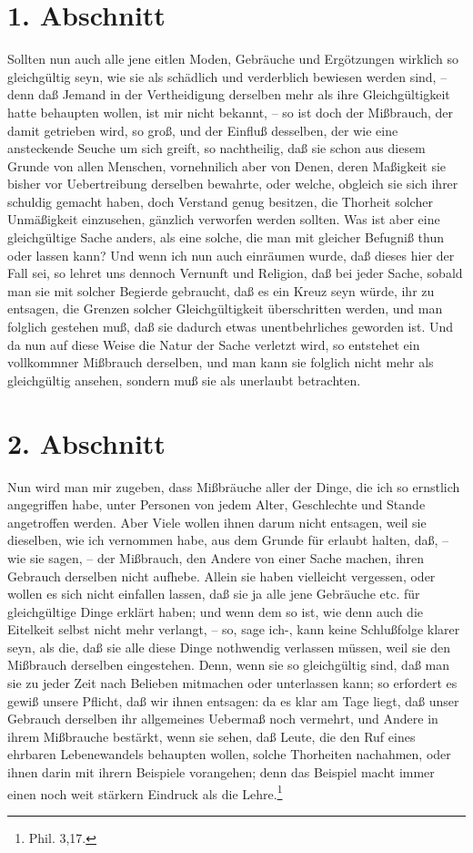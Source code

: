\section{1. Abschnitt}

Sollten nun auch alle jene eitlen Moden, Gebräuche und Ergötzungen wirklich so
gleichgültig seyn, wie sie als schädlich und verderblich bewiesen werden sind,
-- denn daß Jemand in der Vertheidigung derselben mehr als ihre Gleichgültigkeit
hatte behaupten wollen, ist mir nicht bekannt, -- so ist doch der Mißbrauch, der
damit getrieben wird, so groß, und der Einfluß desselben, der wie eine
ansteckende Seuche um sich greift, so nachtheilig, daß sie schon aus diesem
Grunde von allen Menschen, vornehnilich aber von Denen, deren Maßigkeit sie
bisher vor Uebertreibung derselben bewahrte, oder welche, obgleich sie sich
ihrer schuldig gemacht haben, doch Verstand genug besitzen, die Thorheit solcher
Unmäßigkeit einzusehen, gänzlich verworfen werden sollten. Was ist aber eine
gleichgültige Sache anders, als eine solche, die man mit gleicher Befugniß thun
oder lassen kann? Und wenn ich nun auch einräumen wurde, daß dieses hier der
Fall sei, so lehret uns dennoch Vernunft und Religion, daß bei jeder Sache,
sobald man sie mit solcher Begierde gebraucht, daß es ein Kreuz seyn würde, ihr
zu entsagen, die Grenzen solcher Gleichgültigkeit überschritten werden, und man
folglich gestehen muß, daß sie dadurch etwas unentbehrliches geworden ist. Und
da nun auf diese Weise die Natur der Sache verletzt wird, so entstehet ein
vollkommner Mißbrauch derselben, und man kann sie folglich nicht mehr als
gleichgültig ansehen, sondern muß sie als unerlaubt betrachten.

\section{2. Abschnitt}

Nun wird man mir zugeben, dass Mißbräuche aller der Dinge, die ich so ernstlich
angegriffen habe, unter Personen von jedem Alter, Geschlechte und Stande
angetroffen werden. Aber Viele wollen ihnen darum nicht entsagen, weil sie
dieselben, wie ich vernommen habe, aus dem Grunde für erlaubt halten, daß, --
wie sie sagen, -- der Mißbrauch, den Andere von einer Sache  machen, ihren
Gebrauch derselben nicht aufhebe. Allein sie haben vielleicht vergessen, oder
wollen es sich nicht einfallen lassen, daß sie ja alle jene Gebräuche etc. für
gleichgültige Dinge erklärt haben; und wenn dem so ist, wie denn auch die
Eitelkeit selbst nicht mehr verlangt, -- so, sage ich-, kann keine Schlußfolge
klarer seyn, als die, daß sie alle diese Dinge nothwendig verlassen müssen, weil
sie den Mißbrauch derselben eingestehen. Denn, wenn sie so gleichgültig sind,
daß man sie zu jeder Zeit nach Belieben mitmachen oder unterlassen kann; so
erfordert es gewiß unsere Pflicht, daß wir ihnen entsagen: da es klar am Tage
liegt, daß unser Gebrauch derselben ihr allgemeines Uebermaß noch vermehrt, und
Andere in ihrem Mißbrauche bestärkt, wenn sie sehen, daß Leute, die den Ruf
eines ehrbaren Lebenewandels behaupten wollen, solche Thorheiten nachahmen, oder
ihnen darin mit ihrern Beispiele vorangehen; denn das Beispiel macht immer einen
noch weit stärkern Eindruck als die Lehre.\footnote{Phil. 3,17.}


